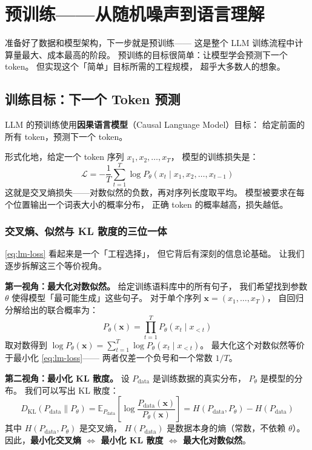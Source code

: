 \chapter{预训练——从随机噪声到语言理解}
\label{ch:pretrain}

准备好了数据和模型架构，下一步就是预训练——
这是整个 LLM 训练流程中计算量最大、成本最高的阶段。
预训练的目标很简单：让模型学会预测下一个 token。
但实现这个「简单」目标所需的工程规模，
超乎大多数人的想象。

\section{训练目标：下一个 Token 预测}

LLM 的预训练使用\textbf{因果语言模型}（Causal Language Model）目标：
给定前面的所有 token，预测下一个 token。

形式化地，给定一个 token 序列 $x_1, x_2, \ldots, x_T$，
模型的训练损失是：
\begin{equation}
  \mathcal{L} = -\frac{1}{T} \sum_{t=1}^{T}
  \log P_\theta(x_t \mid x_1, x_2, \ldots, x_{t-1})
  \label{eq:lm-loss}
\end{equation}
这就是交叉熵损失——对数似然的负数，再对序列长度取平均。
模型被要求在每个位置输出一个词表大小的概率分布，
正确 token 的概率越高，损失越低。

\subsection{交叉熵、似然与 KL 散度的三位一体}

\cref{eq:lm-loss} 看起来是一个「工程选择」，
但它背后有深刻的信息论基础。
让我们逐步拆解这三个等价视角。

\textbf{第一视角：最大化对数似然。}
给定训练语料库中的所有句子，
我们希望找到参数 $\theta$ 使得模型「最可能生成」这些句子。
对于单个序列 $\mathbf{x} = (x_1, \ldots, x_T)$，
自回归分解给出的联合概率为：
\begin{equation}
  P_\theta(\mathbf{x})
  = \prod_{t=1}^{T} P_\theta(x_t \mid x_{<t})
  \label{eq:autoregressive-decomp}
\end{equation}
取对数得到 $\log P_\theta(\mathbf{x}) = \sum_{t=1}^T \log P_\theta(x_t \mid x_{<t})$。
最大化这个对数似然等价于最小化 \cref{eq:lm-loss}——
两者仅差一个负号和一个常数 $1/T$。

\textbf{第二视角：最小化 KL 散度。}
设 $P_{\mathrm{data}}$ 是训练数据的真实分布，
$P_\theta$ 是模型的分布。
我们可以写出 KL 散度：
\begin{equation}
  D_{\mathrm{KL}}(P_{\mathrm{data}} \| P_\theta)
  = \mathbb{E}_{P_{\mathrm{data}}} \left[
    \log \frac{P_{\mathrm{data}}(\mathbf{x})}{P_\theta(\mathbf{x})}
  \right]
  = H(P_{\mathrm{data}}, P_\theta) - H(P_{\mathrm{data}})
\end{equation}
其中 $H(P_{\mathrm{data}}, P_\theta)$ 是交叉熵，
$H(P_{\mathrm{data}})$ 是数据本身的熵（常数，不依赖 $\theta$）。
因此，\textbf{最小化交叉熵 $\Leftrightarrow$ 最小化 KL 散度
$\Leftrightarrow$ 最大化对数似然}。

